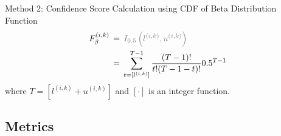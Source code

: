 \begin{mymdframed}{Method 2: Confidence Score Calculation using CDF of Beta Distribution Function}
    \begin{align}
        F_{\beta}^{(i,k)}
        \, & = \, \textcolor{gray}{I_{0.5}\left(l^{(i,k)},u^{(i,k)}\right)} \\
        \, & = \, \sum_{t=[l^{(i,k)}]}^{T-1}\frac{(T-1)!}{t!(T-1-t)!}0.5^{T-1}
        \label{eq:crowd.Eq.15.confidence-score.Beta}
    \end{align}
    where $T = \left [ l^{(i,k)} + u^{(i,k)} \right ] $ and $\left [ \cdot \right ] $ is an integer function.
\end{mymdframed}

\subsection{Metrics}


